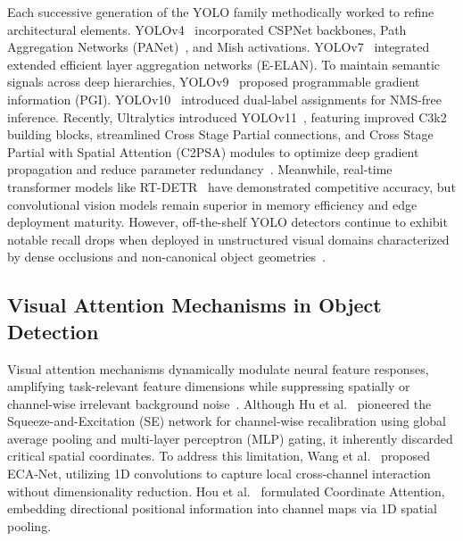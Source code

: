 \documentclass[pdflatex,sn-mathphys]{sn-jnl}
\begin{document}
Each successive generation of the YOLO family methodically worked to refine architectural elements. YOLOv4~\cite{bochkovskiy2020yolov4} incorporated CSPNet backbones, Path Aggregation Networks (PANet)~\cite{liu2018path}, and Mish activations. YOLOv7~\cite{wang2023yolov7} integrated extended efficient layer aggregation networks (E-ELAN). To maintain semantic signals across deep hierarchies, YOLOv9~\cite{wang2024yolov9} proposed programmable gradient information (PGI). YOLOv10~\cite{wang2024yolov10} introduced dual-label assignments for NMS-free inference. Recently, Ultralytics introduced YOLOv11~\cite{jocher2024yolo11}, featuring improved C3k2 building blocks, streamlined Cross Stage Partial connections, and Cross Stage Partial with Spatial Attention (C2PSA) modules to optimize deep gradient propagation and reduce parameter redundancy~\cite{khanam2024yolov11}. Meanwhile, real-time transformer models like RT-DETR~\cite{zhao2024detrs} have demonstrated competitive accuracy, but convolutional vision models remain superior in memory efficiency and edge deployment maturity. However, off-the-shelf YOLO detectors continue to exhibit notable recall drops when deployed in unstructured visual domains characterized by dense occlusions and non-canonical object geometries~\cite{hasan2021bangladeshi,rahman2021densely}.

\subsection{Visual Attention Mechanisms in Object Detection}
Visual attention mechanisms dynamically modulate neural feature responses, amplifying task-relevant feature dimensions while suppressing spatially or channel-wise irrelevant background noise~\cite{woo2018cbam,hu2018squeeze,wang2020eca,hou2021coordinate}. Although Hu et al.~\cite{hu2018squeeze} pioneered the Squeeze-and-Excitation (SE) network for channel-wise recalibration using global average pooling and multi-layer perceptron (MLP) gating, it inherently discarded critical spatial coordinates. To address this limitation, Wang et al.~\cite{wang2020eca} proposed ECA-Net, utilizing 1D convolutions to capture local cross-channel interaction without dimensionality reduction. Hou et al.~\cite{hou2021coordinate} formulated Coordinate Attention, embedding directional positional information into channel maps via 1D spatial pooling.
\end{document}
